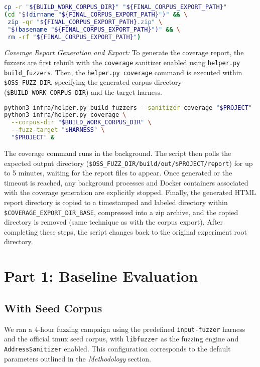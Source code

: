 \documentclass[11pt,a4paper,twocolumn]{article}
\begin{document}
\begin{lstlisting}[language=bash, caption=Bash commands to export and zip the generated corpus]
cp -r "${BUILD_WORK_CORPUS_DIR}" "${FINAL_CORPUS_EXPORT_PATH}"
(cd "$(dirname "${FINAL_CORPUS_EXPORT_PATH}")" && \
 zip -qr "${FINAL_CORPUS_EXPORT_PATH}.zip" \
 "$(basename "${FINAL_CORPUS_EXPORT_PATH}")" && \
 rm -rf "${FINAL_CORPUS_EXPORT_PATH}")
\end{lstlisting}

\emph{Coverage Report Generation and Export:} To generate the coverage report, the fuzzers are first rebuilt with the \texttt{coverage} sanitizer enabled using \texttt{helper.py build\_fuzzers}. Then, the \texttt{helper.py coverage} command is executed within \texttt{\$OSS\_FUZZ\_DIR}, specifying the generated corpus directory (\texttt{\$BUILD\_WORK\_CORPUS\_DIR}) and the target harness.

\begin{lstlisting}[language=bash, caption=Bash commands to rebuild with coverage and generate report]
python3 infra/helper.py build_fuzzers --sanitizer coverage "$PROJECT"
python3 infra/helper.py coverage \
  --corpus-dir "$BUILD_WORK_CORPUS_DIR" \
  --fuzz-target "$HARNESS" \
  "$PROJECT" &
\end{lstlisting}
The coverage command runs in the background. The script then polls the expected output directory (\texttt{\$OSS\_FUZZ\_DIR/build/out/\$PROJECT/report}) for up to 5 minutes, waiting for the report files to appear. Once generated or the timeout is reached, any background processes and Docker containers associated with the coverage generation are explicitly stopped. Finally, the generated HTML report directory is copied to a timestamped and labeled directory within \texttt{\$COVERAGE\_EXPORT\_DIR\_BASE}, compressed into a zip archive, and the copied directory is removed (same technique as with the corpus export). After completing these steps, the script changes back to the original experiment root directory.

\section*{Part 1: Baseline Evaluation}

\subsection*{With Seed Corpus} \label{sec:with-seed}

We ran a 4-hour fuzzing campaign using the predefined \texttt{input-fuzzer} harness and the official tmux seed corpus, with \texttt{libfuzzer} as the fuzzing engine and \texttt{AddressSanitizer} enabled. This configuration corresponds to the default parameters outlined in the \emph{Methodology} section.
\end{document}
